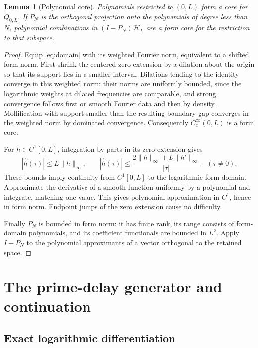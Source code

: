\documentclass[11pt]{article}
\numberwithin{equation}{section}
\newtheorem{lemma}[theorem]{Lemma}
\theoremstyle{definition}
\theoremstyle{remark}
\newcommand{\HH}{\mathcal H}
\newcommand{\norm}[1]{\lVert#1\rVert}
\begin{document}
\begin{lemma}[Polynomial core]\label{lem:core}
Polynomials restricted to $(0,L)$ form a core for $Q_{0,L}$.
If $P_N$ is the orthogonal projection onto the polynomials of degree less
than $N$, polynomial combinations in $(I-P_N)\HH_L$ are a form core for
the restriction to that subspace.
\end{lemma}
\begin{proof}
Equip \eqref{eq:domain} with its weighted Fourier norm, equivalent to a
shifted form norm. First shrink the centered zero extension by a dilation
about the origin so that its support lies in a smaller interval. Dilations
tending to the identity converge in this weighted norm: their norms are
uniformly bounded, since the logarithmic weights at dilated frequencies are
comparable, and strong convergence follows first on smooth Fourier data and
then by density. Mollification with support smaller than the resulting
boundary gap converges in the weighted norm by dominated convergence.
Consequently $C_c^\infty(0,L)$ is a form core.

For $h\in C^1[0,L]$, integration by parts in its zero extension gives
\[
 |\widehat h(\tau)|\le L\norm h_\infty,\qquad
 |\widehat h(\tau)|\le
 \frac{2\norm h_\infty+L\norm{h'}_\infty}{|\tau|}\quad(\tau\ne0).
\]
These bounds imply continuity from $C^1[0,L]$ to the logarithmic form
domain. Approximate the derivative of a smooth function uniformly by a
polynomial and integrate, matching one value. This gives polynomial
approximation in $C^1$, hence in form norm. Endpoint jumps of the zero
extension cause no difficulty.

Finally $P_N$ is bounded in form norm: it has finite rank, its range consists
of form-domain polynomials, and its coefficient functionals are bounded in
$L^2$. Apply $I-P_N$ to the polynomial approximants of a vector orthogonal
to the retained space.
\end{proof}

\section{The prime-delay generator and continuation}\label{sec:generator}

\subsection{Exact logarithmic differentiation}
\end{document}
